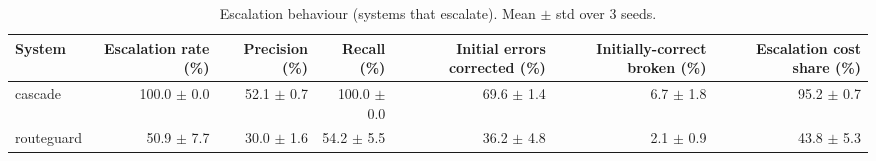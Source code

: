 \begin{table}[t]
\centering
\small
\caption{Escalation behaviour (systems that escalate). Mean $\pm$ std over 3 seeds.}
\label{tab:escalation}
\begin{tabular}{lrrrrrr}
\toprule
System & Escalation rate (\%) & Precision (\%) & Recall (\%) & Initial errors corrected (\%) & Initially-correct broken (\%) & Escalation cost share (\%) \\
\midrule
cascade & 100.0 $\pm$ 0.0 & 52.1 $\pm$ 0.7 & 100.0 $\pm$ 0.0 & 69.6 $\pm$ 1.4 & 6.7 $\pm$ 1.8 & 95.2 $\pm$ 0.7 \\
routeguard & 50.9 $\pm$ 7.7 & 30.0 $\pm$ 1.6 & 54.2 $\pm$ 5.5 & 36.2 $\pm$ 4.8 & 2.1 $\pm$ 0.9 & 43.8 $\pm$ 5.3 \\
\bottomrule
\end{tabular}
\end{table}
